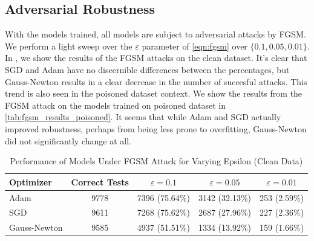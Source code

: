 \documentclass{article}
\begin{document}
    \subsection{Adversarial Robustness}
    With the models trained, all models are subject to adversarial attacks by FGSM.
    We perform a light sweep over the $\varepsilon$ parameter of \cref{eqn:fgsm} over $\{0.1, 0.05, 0.01\}$.
    In , we show the results of the FGSM attacks on the clean dataset.
    It's clear that SGD and Adam have no discernible differences between the percentages, but Gauss-Newton results in a clear decrease in the number of succesful attacks.
    This trend is also seen in the poisoned dataset context.
    We show the results from the FGSM attack on the models trained on poisoned dataset in \cref{tab:fgsm_results_poisoned}.
    It seems that while Adam and SGD actually improved robustness, perhaps from being less prone to overfitting, Gauss-Newton did not significantly change at all.


    \begin{table}[ht!]
        \centering
        \caption{Performance of Models Under FGSM Attack for Varying Epsilon (Clean Data)}
        \label{tab:fgsm_results}
        \begin{tabular}{|l|c|c|c|c|}
            \hline
            \textbf{Optimizer} & \textbf{Correct Tests} & $\varepsilon=0.1$ & $\varepsilon=0.05$ & $\varepsilon=0.01$ \\
            \hline
            Adam               & 9778                   & 7396 (75.64\%)    & 3142 (32.13\%)     & 253 (2.59\%)       \\
            \hline
            SGD                & 9611                   & 7268 (75.62\%)    & 2687 (27.96\%)     & 227 (2.36\%)       \\
            \hline
            Gauss-Newton       & 9585                   & 4937 (51.51\%)    & 1334 (13.92\%)     & 159 (1.66\%)       \\
            \hline
        \end{tabular}
    \end{table}
\end{document}
